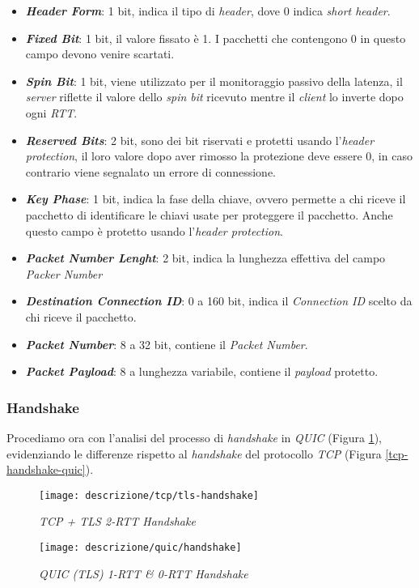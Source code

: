 \begin{itemize}
    \item \textit{\textbf{Header Form}}: 1 bit, indica il tipo di \emph{header}, dove 0 indica \emph{short header}.
    \item \textit{\textbf{Fixed Bit}}: 1 bit, il valore fissato è 1. I pacchetti che contengono 0 in questo campo devono venire scartati.
    \item \textit{\textbf{Spin Bit}}: 1 bit, viene utilizzato per il monitoraggio passivo della latenza, il \emph{server} riflette il valore dello \emph{spin bit} ricevuto mentre il \emph{client} lo inverte dopo ogni \emph{RTT}.
    \item \textit{\textbf{Reserved Bits}}: 2 bit, sono dei bit riservati e protetti usando l'\emph{header protection}, il loro valore dopo aver rimosso la protezione deve essere 0, in caso contrario viene segnalato un errore di connessione.
    \item \textit{\textbf{Key Phase}}: 1 bit, indica la fase della chiave, ovvero permette a chi riceve il pacchetto di identificare le chiavi usate per proteggere il pacchetto. Anche questo campo è protetto usando l'\emph{header protection}.
    \item \textit{\textbf{Packet Number Lenght}}: 2 bit, indica la lunghezza effettiva del campo \emph{Packer Number}
    \item \textit{\textbf{Destination Connection ID}}: 0 a 160 bit, indica il \emph{Connection ID} scelto da chi riceve il pacchetto.
    \item \textit{\textbf{Packet Number}}: 8 a 32 bit, contiene il \emph{Packet Number}.
    \item \textit{\textbf{Packet Payload}}: 8 a lunghezza variabile, contiene il \emph{payload} protetto. 
    \end{itemize}
\subsubsection{Handshake}
Procediamo ora con l'analisi del processo di \emph{handshake} in \emph{QUIC} (Figura \ref{quic-handshake-quic}), evidenziando le differenze rispetto al \emph{handshake} del protocollo \emph{TCP} (Figura \ref{tcp-handshake-quic}).
\begin{figure}[!h]
    \centering
    \begin{minipage}{0.48\textwidth}
        \centering
        \texttt{[image: descrizione/tcp/tls-handshake]}
        \caption{\emph{TCP + TLS 2-RTT Handshake}}
        \label{tcp-handshake-quic}
    \end{minipage}
    \hfill
    \begin{minipage}{0.48\textwidth}
        \centering
        \texttt{[image: descrizione/quic/handshake]}
        \caption{\emph{QUIC (TLS) 1-RTT \& 0-RTT Handshake}}
        \label{quic-handshake-quic}
    \end{minipage}
\end{figure}


